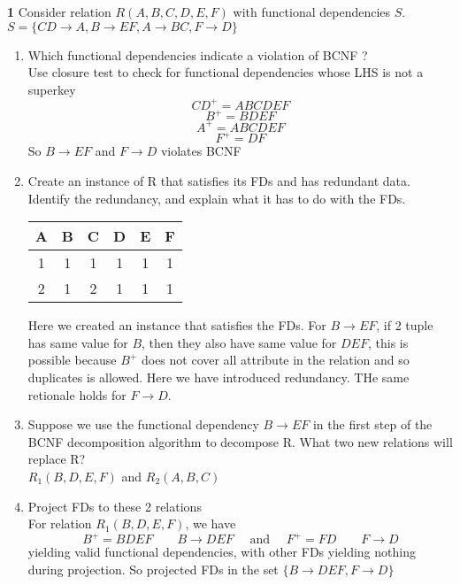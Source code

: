 \documentclass[11pt]{article}
\begin{document}
$ $\\
\textbf{1} Consider relation $R(A, B, C, D, E, F )$ with functional dependencies $S$. $S=\{ CD\to A, B\to EF, A\to BC, F \to D\}$

\begin{solution}
    \begin{enumerate}
        \item Which functional dependencies indicate a violation of BCNF ? \\
        Use closure test to check for functional dependencies whose LHS is not a superkey
        \[
            CD^+ = ABCDEF
        \]
        \[
            B^+ = BDEF
        \]
        \[
            A^+ = ABCDEF 
        \]
        \[
            F^+ = DF
        \]
        So $B\to EF$ and $F\to D$ violates BCNF
        \item Create an instance of R that satisfies its FDs and has redundant data. Identify the redundancy, and explain what it has to do with the FDs.\\
        \begin{center}
            \begin{tabular}{ || c | c | c | c | c | c|| }    
                A & B & C & D & E & F \\ 
                \hline
                1 & 1 & 1 & 1 & 1 & 1 \\
                2 & 1 & 2 & 1 & 1 & 1 \\ 
                \hline
            \end{tabular}
        \end{center}
        Here we created an instance that satisfies the FDs. For $B \to EF$, if 2 tuple has same value for $B$, then they also have same value for $DEF$, this is possible because $B^+$ does not cover all attribute in the relation and so duplicates is allowed. Here we have introduced redundancy. THe same retionale holds for $F \to D$.
        \item Suppose we use the functional dependency $B \to EF$ in the first step of the BCNF decomposition algorithm to decompose R. What two new relations will replace R?\\
        $R_1(B,D,E,F)$ and $R_2(A,B,C)$
        \item Project FDs to these 2 relations \\
        For relation $R_1(B,D,E,F)$, we have
        \[
            B^+ = BDEF \quad\quad B \to DEF  \quad \text{ and } \quad F^+ = FD \quad\quad F \to D
        \]
        yielding valid functional dependencies, with other FDs yielding nothing during projection. So projected FDs in the set $\{ B\to DEF , F\to D \}$

\end{enumerate}
\end{solution}
\end{document}

